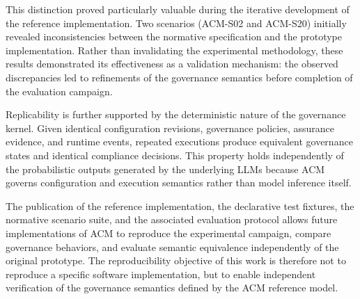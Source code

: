 \documentclass[10pt]{article}
\begin{document}
This distinction proved particularly valuable during the iterative development
of the reference implementation. Two scenarios (ACM-S02 and ACM-S20) initially
revealed inconsistencies between the normative specification and the prototype
implementation. Rather than invalidating the experimental methodology, these
results demonstrated its effectiveness as a validation mechanism: the observed
discrepancies led to refinements of the governance semantics before completion
of the evaluation campaign.

Replicability is further supported by the deterministic nature of the
governance kernel. Given identical configuration revisions, governance
policies, assurance evidence, and runtime events, repeated executions produce
equivalent governance states and identical compliance decisions. This property
holds independently of the probabilistic outputs generated by the underlying
LLMs because ACM governs configuration and execution semantics rather than
model inference itself.

The publication of the reference implementation, the declarative test
fixtures, the normative scenario suite, and the associated evaluation protocol
allows future implementations of ACM to reproduce the experimental campaign,
compare governance behaviors, and evaluate semantic equivalence independently
of the original prototype. The reproducibility objective of this work is
therefore not to reproduce a specific software implementation, but to enable
independent verification of the governance semantics defined by the ACM
reference model.
\end{document}
